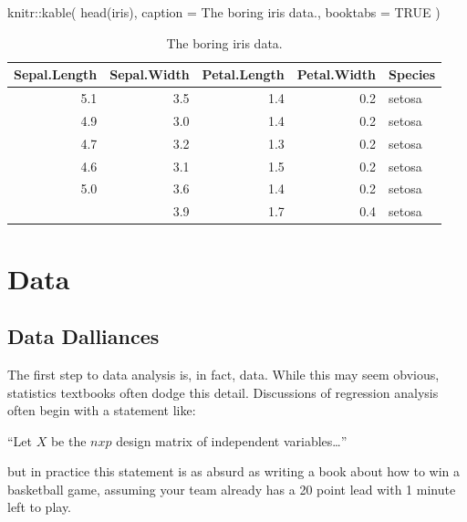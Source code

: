 \documentclass[
]{krantz}
\makeatletter
\newenvironment{Shaded}{\begin{snugshade}}{\end{snugshade}}
\newcommand{\AttributeTok}[1]{\textcolor[rgb]{0.61,0.61,0.61}{#1}}
\newcommand{\ConstantTok}[1]{\textcolor[rgb]{0,0,0}{#1}}
\newcommand{\FunctionTok}[1]{\textcolor[rgb]{0,0,0}{#1}}
\newcommand{\NormalTok}[1]{#1}
\newcommand{\SpecialCharTok}[1]{\textcolor[rgb]{0,0,0}{#1}}
\newcommand{\StringTok}[1]{\textcolor[rgb]{0.5,0.5,0.5}{#1}}
\renewenvironment{quote}{\begin{VF}}{\end{VF}}
\newenvironment{kframe}{%
\medskip{}
\setlength{\fboxsep}{.8em}
 \def\at@end@of@kframe{}%
 \ifinner\ifhmode%
  \def\at@end@of@kframe{\end{minipage}}%
  \begin{minipage}{\columnwidth}%
 \fi\fi%
 \def\FrameCommand##1{\hskip\@totalleftmargin \hskip-\fboxsep
 \colorbox{shadecolor}{##1}\hskip-\fboxsep
     \hskip-\linewidth \hskip-\@totalleftmargin \hskip\columnwidth}%
 \MakeFramed {\advance\hsize-\width
   \@totalleftmargin\z@ \linewidth\hsize
   \@setminipage}}%
 {\par\unskip\endMakeFramed%
 \at@end@of@kframe}
\renewenvironment{Shaded}{\begin{kframe}}{\end{kframe}}
\makeatother
\begin{document}
\begin{Shaded}
\begin{Highlighting}[]
\NormalTok{knitr}\SpecialCharTok{::}\FunctionTok{kable}\NormalTok{(}
  \FunctionTok{head}\NormalTok{(iris), }\AttributeTok{caption =} \StringTok{\textquotesingle{}The boring iris data.\textquotesingle{}}\NormalTok{,}
  \AttributeTok{booktabs =} \ConstantTok{TRUE}
\NormalTok{)}
\end{Highlighting}
\end{Shaded}

\begin{table}

\caption{\label{tab:iris}The boring iris data.}
\centering
\begin{tabular}[t]{rrrrl}
\toprule
Sepal.Length & Sepal.Width & Petal.Length & Petal.Width & Species\\
\midrule
5.1 & 3.5 & 1.4 & 0.2 & setosa\\
4.9 & 3.0 & 1.4 & 0.2 & setosa\\
4.7 & 3.2 & 1.3 & 0.2 & setosa\\
4.6 & 3.1 & 1.5 & 0.2 & setosa\\
5.0 & 3.6 & 1.4 & 0.2 & setosa\\
\addlinespace
5.4 & 3.9 & 1.7 & 0.4 & setosa\\
\bottomrule
\end{tabular}
\end{table}

\hypertarget{part-data}{%
\part*{Data}\label{part-data}}


\hypertarget{data-dall}{%
\chapter{Data Dalliances}\label{data-dall}}

The first step to data analysis is, in fact, data. While this may seem obvious, statistics textbooks often dodge this detail.
Discussions of regression analysis often begin with a statement like:

\begin{quote}
``Let \(X\) be the \(n x p\) design matrix of independent variables\ldots{}''
\end{quote}

but in practice this statement is as absurd as writing a book about how to win a basketball game, assuming your team already has a 20 point lead with 1 minute left to play.
\end{document}
